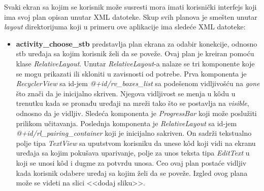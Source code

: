 \documentclass[implementacija.tex]{subfiles}
\begin{document}
Svaki ekran sa kojim se korisnik može susresti mora imati korisnički interfejs koji ima svoj plan opisan unutar XML datoteke. Skup svih planova je smešten unutar \textit{layout} direktorijuma koji u primeru ove aplikacije ima sledeće XML datoteke:
\begin{itemize}
\item \textbf{activity\_choose\_stb} predstavlja plan ekrana za odabir konekcije, odnosno stb uređaja sa kojim korisnik želi da se poveže. Ovaj plan je kreiran pomoću klase \textit{RelativeLayout}. Unutar \textit{RelativeLayout}-a nalaze se tri komponente koje se mogu prikazati ili skloniti u zavisnosti od potrebe. Prva komponenta je \textit{RecyclerView} sa id-jem \textit{@+id/rv\_boxes\_list} sa podešenom vidljivošću na \textit{gone} što znači da je inicijalno skriven. Njegova vidljivost se menja u k\^{o}du u trenutku kada se pronađu uređaji na mreži tako što se postavlja na \textit{visible}, odnosno da je vidljiv. Sledeća komponenta je \textit{ProgressBar} koji može poslužiti prilikom učitavanja. Poslednja komponenta je \textit{RelativeLayout} sa id-jem \textit{@+id/rl\_pairing\_container} koji je inicijalno sakriven. On sadrži tekstualno polje tipa \textit{TextView} sa uputstvom korisniku da unese k\^{o}d koji vidi na ekranu uređaja sa kojim pokušava uparivanje, polje za unos teksta tipa \textit{EditText} u koji se unosi k\^{o}d i dugme za potvrdu unosa. Ceo ovaj plan postaće vidljiv kada korisnik odabere uređaj sa kojim želi da se poveže. Izgled ovog plana može se videti na slici <<dodaj sliku>>.

\end{itemize}
\end{document}
